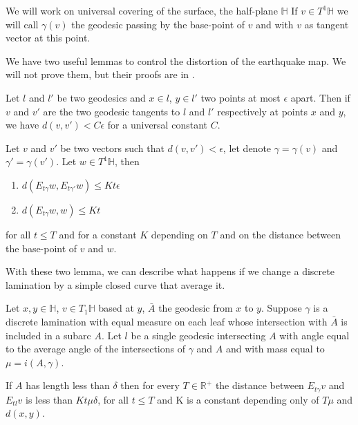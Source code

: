 We will work on universal covering of the surface, the half-plane $\mathbb{H}$
If $v \in T^1 \mathbb{H}$ we will call $\gamma(v)$ the geodesic passing by the base-point of $v$ and with $v$ as tangent vector at this point.

We have two useful lemmas to control the distortion of the earthquake map. We will not prove them, but their proofs are in \cite{NielsenRealizationPro}.

\begin{lem}\label{DisVec}
Let $l$ and $l'$ be two geodesics and $x \in l$, $y \in l'$ two points at most $\epsilon$ apart. Then if $v$ and $v'$ are the two geodesic tangents to $l$ and $l'$ respectively at points $x$ and $y$,
we have $d(v,v')<C \epsilon$ for a universal constant $C$.
\end{lem}

\begin{lem}\label{DisShe}
Let $v$ and $v'$ be two vectors such that $d(v,v') < \epsilon$, let denote $\gamma=\gamma(v)$ and $\gamma'=\gamma(v')$. Let $w\in T^1 \mathbb{H}$, then \begin{enumerate}
\item $d(E_{t \gamma}w,E_{t \gamma'}w) \leq Kt \epsilon$
\item $d(E_{t \gamma}w,w) \leq Kt $
\end{enumerate}
for all $t\leq T$ and for a constant $K$ depending on $T$ and on the distance between the base-point of $v$ and $w$.
\end{lem}

With these two lemma, we can describe what happens if we change a discrete lamination by a simple closed curve that average it.

\begin{lem}
Let $x,y \in \mathbb{H}$, $v\in T_1 \mathbb{H}$ based at $y$, $\bar{A}$ the geodesic from $x$ to $y$. Suppose $\gamma$ is a discrete lamination with equal measure on each leaf whose intersection with $\bar{A}$ is included in a subarc $A$. Let $l$ be a single geodesic intersecting $A$ with angle equal to the average angle of the intersections of $\gamma$ and $A$ and with mass equal to $\mu=i(A,\gamma)$.

If $A$ has length less than $\delta$ then for every $T\in \mathbb{R}^+$ the distance between $E_{t\gamma}v$ and $E_{t l}v$ is less than $Kt \mu \delta$, for all $t \leq T$ and K is a constant depending only of $T \mu$ and $d(x,y)$.
\end{lem} %


